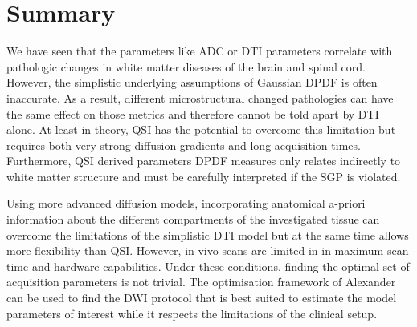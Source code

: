 \section{Summary}
We have seen that the parameters like ADC or DTI parameters correlate with pathologic changes in white matter diseases of the brain and spinal cord. However, the simplistic underlying assumptions of Gaussian DPDF is often inaccurate. As a result, different microstructural changed pathologies can have the same effect on those metrics and therefore cannot be told apart by DTI alone. At least in theory, QSI has the potential to overcome this limitation but requires both very strong diffusion gradients and long acquisition times. Furthermore, QSI derived parameters DPDF measures only relates indirectly to white matter structure and must be carefully interpreted if the SGP is violated.


Using more advanced diffusion models, incorporating anatomical a-priori information about the different compartments of the investigated tissue can overcome the limitations of the simplistic DTI model but at the same time allows more flexibility than QSI. However, in-vivo scans are limited in in maximum scan time and hardware capabilities. Under these conditions, finding the optimal set of acquisition parameters is not trivial. The  optimisation framework of Alexander can be used to find the DWI protocol that is best suited to estimate the model parameters of interest while it respects the limitations of the clinical setup.  
